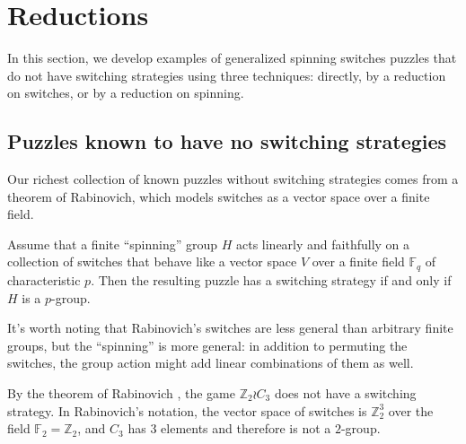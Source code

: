 


\section{Reductions}
\label{sec:Reductions}
In this section, we develop examples of generalized spinning switches puzzles
that do not have switching strategies using three techniques:
directly, by a reduction on switches, or by a reduction on spinning.
%
\subsection{Puzzles known to have no switching strategies}
Our richest collection of known puzzles without switching strategies comes from
a theorem of Rabinovich, which models switches as a vector space over
a finite field.
\begin{theorem} \cite{Rabinovich2022}
  Assume that a finite ``spinning'' group $H$ acts linearly and faithfully on
  a collection of switches that behave like a vector space
  $V$ over a finite field $\mathbb F_q$ of characteristic $p$.
  Then the resulting puzzle has a switching strategy if and only if $H$ is a
  $p$-group.
  \label{thm:Rabinovich}
\end{theorem}
It's worth noting that Rabinovich's switches are less general than arbitrary
finite groups, but the ``spinning'' is more general: in addition to permuting
the switches, the group action might add linear combinations of them as well.
\begin{example}
  By the theorem of Rabinovich \cite{Rabinovich2022},
  the game $\mathbb Z_2 \wr C_3$ does not have a
  switching strategy. In Rabinovich's notation, the vector space of switches
  is $\mathbb Z_2^3$ over the field $\mathbb F_2 = \mathbb Z_2$, and
  $C_3$ has $3$ elements and therefore is not a $2$-group.
  \label{ex:NoSolutionZ2C3}
\end{example}

